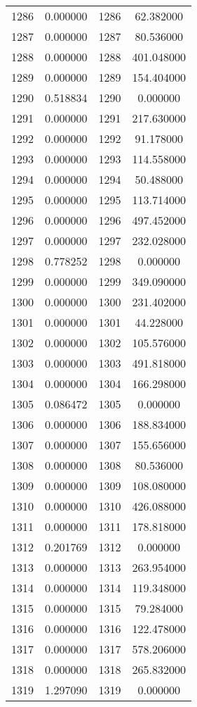 \documentclass[12pt]{article}
\begin{document}
\begin{longtable}{@{}cccc@{}}
1286 & 0.000000 & 1286 & 62.382000 \\
1287 & 0.000000 & 1287 & 80.536000 \\
1288 & 0.000000 & 1288 & 401.048000 \\
1289 & 0.000000 & 1289 & 154.404000 \\
1290 & 0.518834 & 1290 & 0.000000 \\
1291 & 0.000000 & 1291 & 217.630000 \\
1292 & 0.000000 & 1292 & 91.178000 \\
1293 & 0.000000 & 1293 & 114.558000 \\
1294 & 0.000000 & 1294 & 50.488000 \\
1295 & 0.000000 & 1295 & 113.714000 \\
1296 & 0.000000 & 1296 & 497.452000 \\
1297 & 0.000000 & 1297 & 232.028000 \\
1298 & 0.778252 & 1298 & 0.000000 \\
1299 & 0.000000 & 1299 & 349.090000 \\
1300 & 0.000000 & 1300 & 231.402000 \\
1301 & 0.000000 & 1301 & 44.228000 \\
1302 & 0.000000 & 1302 & 105.576000 \\
1303 & 0.000000 & 1303 & 491.818000 \\
1304 & 0.000000 & 1304 & 166.298000 \\
1305 & 0.086472 & 1305 & 0.000000 \\
1306 & 0.000000 & 1306 & 188.834000 \\
1307 & 0.000000 & 1307 & 155.656000 \\
1308 & 0.000000 & 1308 & 80.536000 \\
1309 & 0.000000 & 1309 & 108.080000 \\
1310 & 0.000000 & 1310 & 426.088000 \\
1311 & 0.000000 & 1311 & 178.818000 \\
1312 & 0.201769 & 1312 & 0.000000 \\
1313 & 0.000000 & 1313 & 263.954000 \\
1314 & 0.000000 & 1314 & 119.348000 \\
1315 & 0.000000 & 1315 & 79.284000 \\
1316 & 0.000000 & 1316 & 122.478000 \\
1317 & 0.000000 & 1317 & 578.206000 \\
1318 & 0.000000 & 1318 & 265.832000 \\
1319 & 1.297090 & 1319 & 0.000000 \\

\end{longtable}
\end{document}
